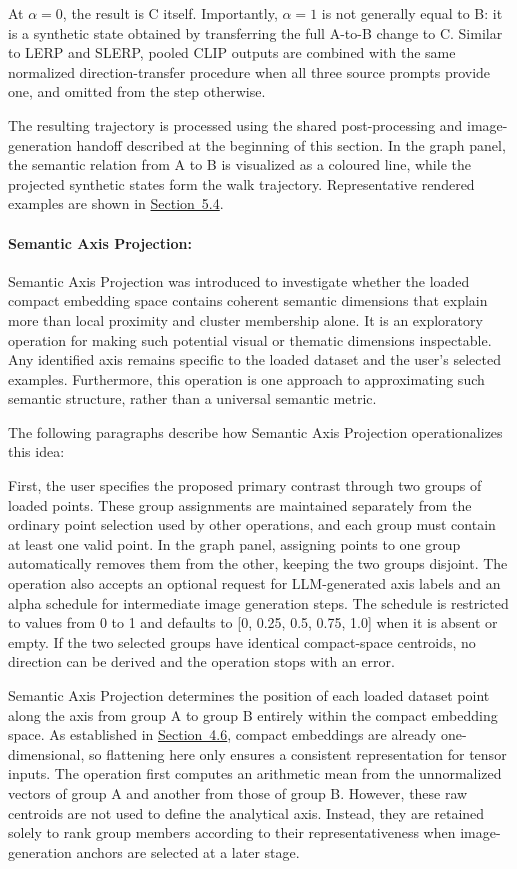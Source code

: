 At $\alpha = 0$, the result is C itself. Importantly, $\alpha = 1$ is not generally equal to B: it is a synthetic state obtained by transferring the full A-to-B change to C. Similar to LERP and SLERP, pooled CLIP outputs are combined with the same normalized direction-transfer procedure when all three source prompts provide one, and omitted from the step otherwise.

The resulting trajectory is processed using the shared post-processing and image-generation handoff described at the beginning of this section. In the graph panel, the semantic relation from A to B is visualized as a coloured line, while the projected synthetic states form the walk trajectory. Representative rendered examples are shown in \hyperref[sec:5.4]{Section~5.4}.

\paragraph{Semantic Axis Projection:} Semantic Axis Projection was introduced to investigate whether the loaded compact embedding space contains coherent semantic dimensions that explain more than local proximity and cluster membership alone. It is an exploratory operation for making such potential visual or thematic dimensions inspectable. Any identified axis remains specific to the loaded dataset and the user's selected examples. Furthermore, this operation is one approach to approximating such semantic structure, rather than a universal semantic metric.

The following paragraphs describe how Semantic Axis Projection operationalizes this idea:

First, the user specifies the proposed primary contrast through two groups of loaded points. These group assignments are maintained separately from the ordinary point selection used by other operations, and each group must contain at least one valid point. In the graph panel, assigning points to one group automatically removes them from the other, keeping the two groups disjoint. The operation also accepts an optional request for LLM-generated axis labels and an alpha schedule for intermediate image generation steps. The schedule is restricted to values from 0 to 1 and defaults to [0, 0.25, 0.5, 0.75, 1.0] when it is absent or empty. If the two selected groups have identical compact-space centroids, no direction can be derived and the operation stops with an error.

Semantic Axis Projection determines the position of each loaded dataset point along the axis from group A to group B entirely within the compact embedding space. As established in \hyperref[sec:4.6]{Section~4.6}, compact embeddings are already one-dimensional, so flattening here only ensures a consistent representation for tensor inputs. The operation first computes an arithmetic mean from the unnormalized vectors of group A and another from those of group B. However, these raw centroids are not used to define the analytical axis. Instead, they are retained solely to rank group members according to their representativeness when image-generation anchors are selected at a later stage.

